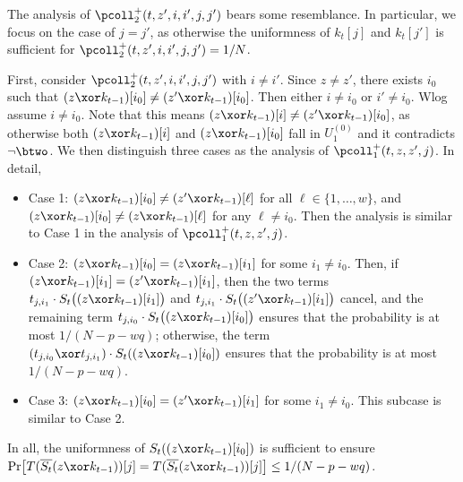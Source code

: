 
	
	
	\arrangespace
	
	
	The analysis of $\pcoll_{2}^+(t,z',i,i',j,j')$ bears some resemblance. In particular, we focus on the case of $j=j'$, as otherwise the uniformness of $k_t[j]$ and $k_t[j']$ is sufficient for $\pcoll_{2}^+(t,z',i,i',j,j')=1/N$.
	
	
	First, consider $\pcoll_{2}^+(t,z',i,i',j,j')$ with $i\neq i'$. Since $z\neq z'$, there exists $i_0$ such that $(z\xor k_{t-1})[i_0]\neq(z'\xor k_{t-1})[i_0]$. Then either $i\neq i_0$ or $i'\neq i_0$. Wlog assume $i\neq i_0$. Note that this means $(z\xor k_{t-1})[i]\neq(z'\xor k_{t-1})[i_0]$, as otherwise both $(z\xor k_{t-1})[i]$ and $(z\xor k_{t-1})[i_0]$ fall in $U_1^{(0)}$ and it contradicts $\neg\btwo$. We then distinguish three cases as the analysis of $\pcoll_{1}^+(t,z,z',j)$. In detail,
	\begin{itemize}
		\item Case 1: $(z\xor k_{t-1})[i_0]\neq(z'\xor k_{t-1})[\ell]$ for all $\ell\in\{1,\ldots,w\}$, and $(z\xor k_{t-1})[i_0]\neq(z\xor k_{t-1})[\ell]$ for any $\ell\neq i_0$. Then the analysis is similar to Case 1 in the analysis of $\pcoll_{1}^+(t,z,z',j)$.
		\item Case 2: $(z\xor k_{t-1})[i_0]=(z\xor k_{t-1})[i_1]$ for some $i_1\neq i_0$. Then, if $(z\xor k_{t-1})[i_1]=(z'\xor k_{t-1})[i_1]$, then the two terms $t_{j,i_1}\cdot S_t\big((z\xor k_{t-1})[i_1]\big)$ and $t_{j,i_1}\cdot S_t\big((z'\xor k_{t-1})[i_1]\big)$ cancel, and the remaining term $t_{j,i_0}\cdot S_t\big((z\xor k_{t-1})[i_0]\big)$ ensures that the probability is at most $1/(N-p-wq)$; otherwise, the term $(t_{j,i_0}\xor t_{j,i_1})\cdot S_t((z\xor k_{t-1})[i_0])$ ensures that the probability is at most $1/(N-p-wq)$.
		\item Case 3: $(z\xor k_{t-1})[i_0]=(z'\xor k_{t-1})[i_1]$ for some $i_1\neq i_0$. This subcase is similar to Case 2.
	\end{itemize}
	In all, the uniformness of $S_t((z\xor k_{t-1})[i_0])$ is sufficient to ensure ${\Pr}\big[T(\overline{S_t}(z\xor k_{t-1}))[j]=T(\overline{S_t}(z\xor k_{t-1}))[j]\big]\leq1/(N-p-wq)$.
	
	
	
	\arrangespace
	
